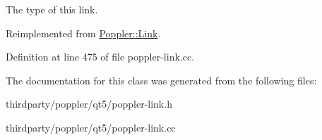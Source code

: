 The type of this link. 

Reimplemented from \hyperlink{class_poppler_1_1_link_a3e3ad7e8867e255c24b9a562bad596ed}{Poppler\+::\+Link}.



Definition at line 475 of file poppler-\/link.\+cc.



The documentation for this class was generated from the following files\+:\begin{DoxyCompactItemize}
\item 
thirdparty/poppler/qt5/poppler-\/link.\+h\item 
thirdparty/poppler/qt5/poppler-\/link.\+cc\end{DoxyCompactItemize}
